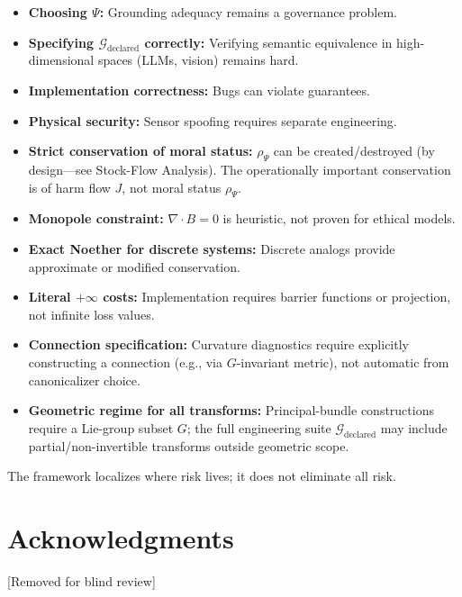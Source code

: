 \documentclass[12pt]{article}
\begin{document}
\begin{itemize}
\item \textbf{Choosing $\Psi$:} Grounding adequacy remains a governance problem.
\item \textbf{Specifying $\mathcal{G}_{\text{declared}}$ correctly:} Verifying semantic equivalence in high-dimensional spaces
(LLMs, vision) remains hard.
\item \textbf{Implementation correctness:} Bugs can violate guarantees.
\item \textbf{Physical security:} Sensor spoofing requires separate engineering.
\item \textbf{Strict conservation of moral status:} $\rho_\Psi$ can be created/destroyed (by design---see Stock-Flow Analysis). The operationally important conservation is of harm flow $J$, not moral status
$\rho_\Psi$.
\item \textbf{Monopole constraint:} $\nabla \cdot B = 0$ is heuristic, not proven for ethical models.
\item \textbf{Exact Noether for discrete systems:} Discrete analogs provide approximate or modified
conservation.
\item \textbf{Literal $+\infty$ costs:} Implementation requires barrier functions or projection, not infinite loss
values.
\item \textbf{Connection specification:} Curvature diagnostics require explicitly constructing a connection
(e.g., via $G$-invariant metric), not automatic from canonicalizer choice.
\item \textbf{Geometric regime for all transforms:} Principal-bundle constructions require a Lie-group
subset $G$; the full engineering suite $\mathcal{G}_{\text{declared}}$ may include partial/non-invertible transforms
outside geometric scope.
\end{itemize}

The framework localizes where risk lives; it does not eliminate all risk.

\section*{Acknowledgments}

[Removed for blind review]
\end{document}

